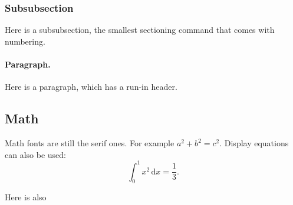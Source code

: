 \documentclass{ip-doc}
\begin{document}
\subsubsection{Subsubsection}
Here is a subsubsection, the smallest sectioning command that comes with numbering.

\paragraph{Paragraph.}
Here is a paragraph, which has a run-in header.

\subsection{Math}
Math fonts are still the serif ones.
For example $a^2 + b^2 = c^2$.
Display equations can also be used:
\begin{equation}
  \int_0^1 x^2 \, \mathrm{d}x = \frac13.
\end{equation}

Here is also \lipsum
\end{document}
